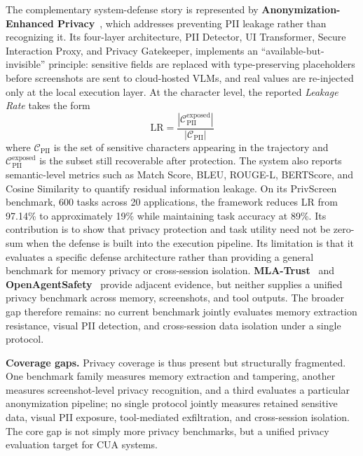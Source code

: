 The complementary system-defense story is represented by \textbf{Anonymization-Enhanced Privacy}~\cite{anonprivacy2026}, which addresses preventing PII leakage rather than recognizing it. Its four-layer architecture, PII Detector, UI Transformer, Secure Interaction Proxy, and Privacy Gatekeeper, implements an ``available-but-invisible'' principle: sensitive fields are replaced with type-preserving placeholders before screenshots are sent to cloud-hosted VLMs, and real values are re-injected only at the local execution layer. At the character level, the reported \emph{Leakage Rate} takes the form
\begin{equation}
\mathrm{LR} = \frac{|\mathcal{C}_{\mathrm{PII}}^{\mathrm{exposed}}|}{|\mathcal{C}_{\mathrm{PII}}|}
\label{eq:lr}
\end{equation}
where $\mathcal{C}_{\mathrm{PII}}$ is the set of sensitive characters appearing in the trajectory and $\mathcal{C}_{\mathrm{PII}}^{\mathrm{exposed}}$ is the subset still recoverable after protection. The system also reports semantic-level metrics such as Match Score, BLEU, ROUGE-L, BERTScore, and Cosine Similarity to quantify residual information leakage. On its PrivScreen benchmark, 600 tasks across 20 applications, the framework reduces LR from 97.14\% to approximately 19\% while maintaining task accuracy at 89\%. Its contribution is to show that privacy protection and task utility need not be zero-sum when the defense is built into the execution pipeline. Its limitation is that it evaluates a specific defense architecture rather than providing a general benchmark for memory privacy or cross-session isolation. \textbf{MLA-Trust}~\cite{mlatrust2025} and \textbf{OpenAgentSafety}~\cite{openagentsafety2025} provide adjacent evidence, but neither supplies a unified privacy benchmark across memory, screenshots, and tool outputs. The broader gap therefore remains: no current benchmark jointly evaluates memory extraction resistance, visual PII detection, and cross-session data isolation under a single protocol.

\textbf{Coverage gaps.} Privacy coverage is thus present but structurally fragmented. One benchmark family measures memory extraction and tampering, another measures screenshot-level privacy recognition, and a third evaluates a particular anonymization pipeline; no single protocol jointly measures retained sensitive data, visual PII exposure, tool-mediated exfiltration, and cross-session isolation. The core gap is not simply more privacy benchmarks, but a unified privacy evaluation target for CUA systems.

